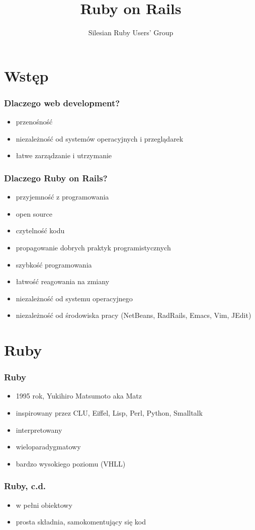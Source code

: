 \documentclass[12t]{beamer}
\author{Silesian Ruby Users' Group}
\title{Ruby on Rails}
\begin{document}
\frame{\titlepage}

\section{Wstęp}
\begin{frame}
  \frametitle{Dlaczego web development?}
  \begin{itemize}
  \item przenośność
  \item niezależność od systemów operacyjnych i przeglądarek
  \item łatwe zarządzanie i utrzymanie
  \end{itemize}
\end{frame}

\begin{frame}
  \frametitle{Dlaczego Ruby on Rails?}
  \begin{itemize}
  \item przyjemność z programowania
  \item open source
  \item czytelność kodu
  \item propagowanie dobrych praktyk programistycznych
  \item szybkość programowania
  \item łatwość reagowania na zmiany
  \item niezależność od systemu operacyjnego
  \item niezależność od środowiska pracy (NetBeans, RadRails, Emacs,
    Vim, JEdit)
  \end{itemize}
\end{frame}

\section{Ruby}
\begin{frame}
  \frametitle{Ruby}
  \begin{itemize}
  \item 1995 rok, Yukihiro Matsumoto aka Matz
  \item inspirowany przez CLU, Eiffel, Lisp, Perl, Python, Smalltalk
  \item interpretowany
  \item wieloparadygmatowy
  \item bardzo wysokiego poziomu (VHLL)
  \end{itemize}
\end{frame}

\begin{frame}
  \frametitle{Ruby, c.d.}
  \begin{itemize}
  \item w pełni obiektowy
  \item prosta składnia, samokomentujący się kod
  
  \end{itemize}
\end{frame}
\end{document}
